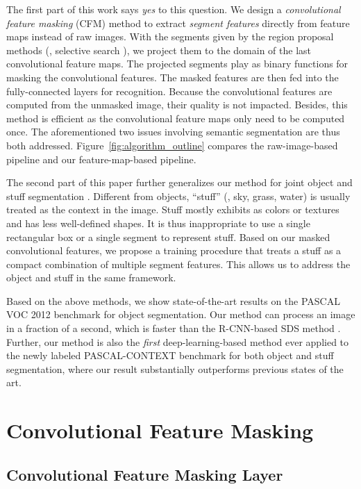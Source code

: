 \documentclass[10pt,twocolumn,letterpaper]{article}
\begin{document}
The first part of this work says \emph{yes} to this question. We design a \emph{convolutional feature masking} (CFM) method to extract \emph{segment features} directly from feature maps instead of raw images. With the segments given by the region proposal methods (\eg, selective search \cite{uijlings2013selective}), we project them to the domain of the last convolutional feature maps. The projected segments play as binary functions for masking the convolutional features. The masked features are then fed into the fully-connected layers for recognition. Because the convolutional features are computed from the unmasked image, their quality is not impacted. Besides, this method is efficient as the convolutional feature maps only need to be computed once. The aforementioned two issues involving semantic segmentation are thus both addressed. Figure~\ref{fig:algorithm_outline} compares the raw-image-based pipeline and our feature-map-based pipeline.

The second part of this paper further generalizes our method for joint object and stuff segmentation \cite{mottaghi2014role}. Different from objects, ``stuff'' \cite{mottaghi2014role} (\eg, sky, grass, water) is usually treated as the context in the image. Stuff mostly exhibits as colors or textures and has less well-defined shapes. It is thus inappropriate to use a single rectangular box or a single segment to represent stuff. Based on our masked convolutional features, we propose a training procedure that treats a stuff as a compact combination of multiple segment features. This allows us to address the object and stuff in the same framework.

Based on the above methods, we show state-of-the-art results on the PASCAL VOC 2012 benchmark \cite{everingham2010pascal} for object segmentation. Our method can process an image in a fraction of a second, which is  faster than the R-CNN-based SDS method \cite{hariharan2014simultaneous}.
Further, our method is also the \emph{first} deep-learning-based method ever applied to the newly labeled PASCAL-CONTEXT benchmark \cite{mottaghi2014role} for both object and stuff segmentation, where our result substantially outperforms previous states of the art.

\section{Convolutional Feature Masking}

\subsection{Convolutional Feature Masking Layer}
\end{document}
